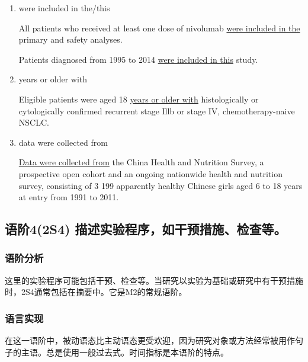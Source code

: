 \documentclass[a4paper]{ctexbook}
\begin{document}
    \begin{enumerate}
      \item were included in the/this
      \begin{eg}{}
        All patients who received at least one dose of nivolumab \uline{were included in the} primary and safety analyses.
      \end{eg}
        
      \begin{eg}{}
        Patients diagnosed from 1995 to 2014 \uline{were included in this} study.
      \end{eg}

      \item years or older with
      \begin{eg}{}
        Eligible patients were aged 18 \uline{years or older with} histologically or cytologically confirmed recurrent stage Illb or stage IV, chemotherapy-naive NSCLC.
      \end{eg}

      \item data were collected from
      \begin{eg}{}
        \uline{Data were collected from} the China Health and Nutrition Survey, a prospective open cohort and an ongoing nationwide health and nutrition survey, consisting of 3 199 apparently healthy Chinese girls aged 6 to 18 years at entry from 1991 to 2011.
      \end{eg}
    \end{enumerate}

  \subsection{语阶4(2S4) 描述实验程序，如干预措施、检查等。}

    \subsubsection{语阶分析}

    这里的实验程序可能包括干预、检查等。当研究以实验为基础或研究中有干预措施时，2S4通常包括在摘要中。它是M2的常规语阶。

    \subsubsection{语言实现}

    在这一语阶中，被动语态比主动语态更受欢迎，因为研究对象或方法经常被用作句子的主语。总是使用一般过去式。时间指标是本语阶的特点。
\end{document}

